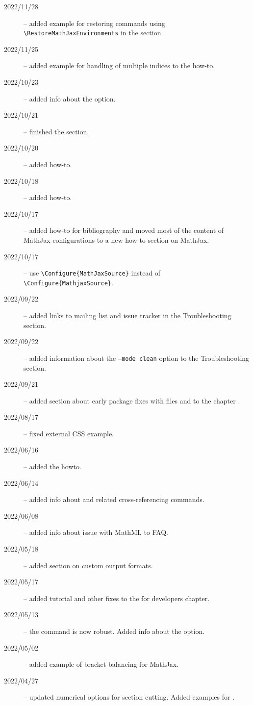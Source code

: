 
\begin{description}
  \item[2022/11/28] -- added example for restoring commands using \verb|\RestoreMathJaxEnvironments| in the  section.
  \item[2022/11/25] -- added example for handling of multiple indices to the  how-to.
  \item[2022/10/23] -- added info about the  option.
  \item[2022/10/21] -- finished the  section.
  \item[2022/10/20] -- added  how-to.
  \item[2022/10/18] -- added  how-to.
  \item[2022/10/17] -- added how-to for bibliography and moved most of the content of MathJax configurations to a new how-to section on MathJax. 
  \item[2022/10/17] -- use \verb|\Configure{MathJaxSource}| instead of \verb|\Configure{MathjaxSource}|.
  \item[2022/09/22] -- added links to mailing list and issue tracker in the Troubleshooting section.
  \item[2022/09/22] -- added information about the \texttt{--mode clean} option to the Troubleshooting section.
  \item[2022/09/21] -- added section about early package fixes with  files and  to the chapter .
  \item[2022/08/17] -- fixed external CSS example.
  \item[2022/06/16] -- added the  howto.
  \item[2022/06/14] -- added info about  and related cross-referencing commands.
  \item[2022/06/08] -- added info about  issue with MathML to FAQ.
  \item[2022/05/18] -- added section on custom output formats.
  \item[2022/05/17] -- added tutorial and other fixes to the for developers chapter.
  \item[2022/05/13] -- the  command is now robust. Added info about the  option.
  \item[2022/05/02] -- added example of bracket balancing for MathJax.
  \item[2022/04/27] -- updated numerical options for section cutting. Added examples for .

\end{description}
